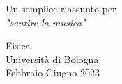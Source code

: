 \documentclass[
10pt, %
a4paper, %
oneside, %
headinclude,footinclude, %
BCOR5mm, %
]{scrartcl}
\begin{document}
	\begin{titlepage}
		\begin{center}
			\vspace*{1cm}
			
			\Huge{\normalfont{}} %
			
			\vspace{0.5cm}
			
			\vspace{1.5cm}
			
			\Large{}
			
			\vspace{3.5cm}
			\LARGE{Un semplice riassunto per\\
				\textit{"sentire la musica"}}\\
			
			\vfill
			
			\vspace{2cm}
			\Large
			Fisica\\
			Università di Bologna\\
			Febbraio-Giugno 2023
			
		\end{center}
	\end{titlepage}
	
	
	\renewcommand{\sectionmark}[1]{\markright{\spacedlowsmallcaps{#1}}} %
	\lehead{\mbox{\llap{\small\thepage\kern1em\color{halfgray} \vline}\color{halfgray}\hspace{0.5em}\rightmark\hfil}} %
	
	\pagestyle{scrheadings} %
	
	
	
\end{document}
